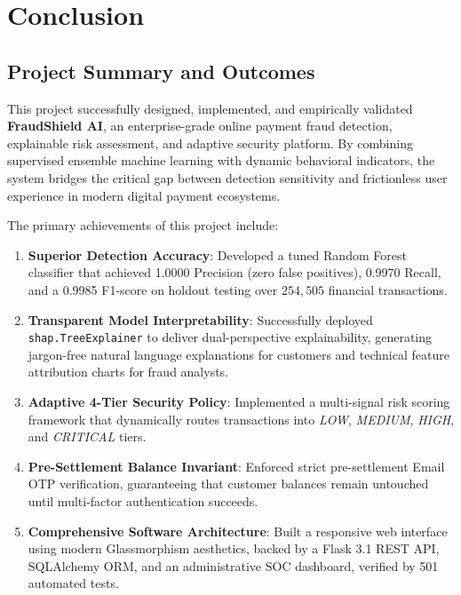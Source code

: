 \chapter{Conclusion}
\label{chap:conclusion}

\section{Project Summary and Outcomes}
This project successfully designed, implemented, and empirically validated \textbf{FraudShield AI}, an enterprise-grade online payment fraud detection, explainable risk assessment, and adaptive security platform. By combining supervised ensemble machine learning with dynamic behavioral indicators, the system bridges the critical gap between detection sensitivity and frictionless user experience in modern digital payment ecosystems.

The primary achievements of this project include:
\begin{enumerate}[label=\alph*.]
    \item \textbf{Superior Detection Accuracy}: Developed a tuned Random Forest classifier that achieved 1.0000 Precision (zero false positives), 0.9970 Recall, and a 0.9985 F1-score on holdout testing over $254,505$ financial transactions.
    \item \textbf{Transparent Model Interpretability}: Successfully deployed \texttt{shap.TreeExplainer} to deliver dual-perspective explainability, generating jargon-free natural language explanations for customers and technical feature attribution charts for fraud analysts.
    \item \textbf{Adaptive 4-Tier Security Policy}: Implemented a multi-signal risk scoring framework that dynamically routes transactions into \textit{LOW}, \textit{MEDIUM}, \textit{HIGH}, and \textit{CRITICAL} tiers.
    \item \textbf{Pre-Settlement Balance Invariant}: Enforced strict pre-settlement Email OTP verification, guaranteeing that customer balances remain untouched until multi-factor authentication succeeds.
    \item \textbf{Comprehensive Software Architecture}: Built a responsive web interface using modern Glassmorphism aesthetics, backed by a Flask 3.1 REST API, SQLAlchemy ORM, and an administrative SOC dashboard, verified by 501 automated tests.
\end{enumerate}

